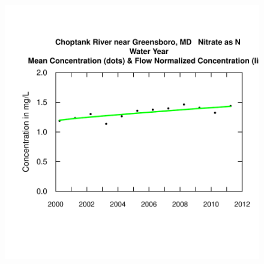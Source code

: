 \documentclass[a4paper,11pt]{article}
\begin{document}
\begin{figure}[htbp]
  \begin{minipage}[h]{0.5\linewidth}
    \begin{center}

\includegraphics{EGRET-figplotConcHist}
    \label{fig:plotConcHist}
    \end{center}
  \end{minipage}
  \hspace{0.5cm}
  \begin{minipage}[h]{0.5\linewidth}
    \begin{center}



\end{center}
\end{minipage}
\end{figure}
\end{document}
